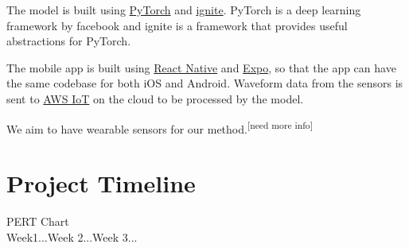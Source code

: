 \documentclass[11pt]{article}
\theoremstyle{definition}
\begin{document}
    The model is built using \href{https://github.com/pytorch/pytorch}{PyTorch} and \href{https://github.com/pytorch/ignite}{ignite}.
    PyTorch is a deep learning framework by facebook and ignite is a framework that provides useful abstractions for PyTorch.
    
    The mobile app is built using \href{https://facebook.github.io/react-native/}{React Native} and \href{https://expo.io/}{Expo}, so that the app can have the same codebase for both iOS and Android.
    Waveform data from the sensors is sent to \href{https://aws.amazon.com/iot/}{AWS IoT} on the cloud to be processed by the model.

    We aim to have wearable sensors for our method.\textsuperscript{[need more info]}

  \section{Project Timeline}
    PERT Chart\\
    Week1...Week 2...Week 3...
  
  \newpage
  
  
\end{document}
